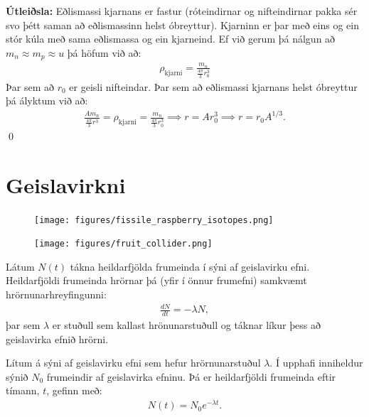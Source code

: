 \textbf{Útleiðsla:} Eðlismassi kjarnans er fastur (róteindirnar og nifteindirnar pakka sér svo þétt saman að eðlismassinn helst óbreyttur). Kjarninn er þar með eins og ein stór kúla með sama eðlismassa og ein kjarneind. Ef við gerum þá nálgun að $m_n \approx m_p \approx u$ þá höfum við að:
\begin{align*}
    \rho_{\text{kjarni}} = \frac{m_n}{\frac{4\pi}{3}r_0^3}
\end{align*}
Þar sem að $r_0$ er geisli nifteindar. Þar sem að eðlismassi kjarnans helst óbreyttur þá ályktum við að:
\begin{align*}
    \frac{Am_n}{\frac{4\pi}{3}r^3} = \rho_{\text{kjarni}} = \frac{m_n}{\frac{4\pi}{3}r_0^3} \implies r = Ar_0^3 \implies r = r_0 A^{1/3}.
\end{align*}
\qed

\section{Geislavirkni}

\begin{figure}[H]
    \centering
    \texttt{[image: figures/fissile\_raspberry\_isotopes.png]}
\end{figure}

\begin{figure}[H]
    \centering
    \texttt{[image: figures/fruit\_collider.png]}
\end{figure}

\begin{tcolorbox}
\begin{definition}
Látum $N(t)$ tákna heildarfjölda frumeinda í sýni af geislavirku efni. Heildarfjöldi frumeinda hrörnar þá (yfir í önnur frumefni) samkvæmt hrörnunarhreyfingunni: 
\begin{align*}
    \frac{dN}{dt} = -\lambda N,
\end{align*}
þar sem $\lambda$ er stuðull sem kallast hrönunarstuðull og táknar líkur þess að geislavirka efnið hrörni.
\end{definition}
\end{tcolorbox}

\begin{tcolorbox}
\begin{theorem}
Lítum á sýni af geislavirku efni sem hefur hrörnunarstuðul $\lambda$. Í upphafi inniheldur sýnið $N_0$ frumeindir af geislavirka efninu. Þá er heildarfjöldi frumeinda eftir tímann, $t$, gefinn með:
\begin{align*}
    N(t) = N_0 e^{-\lambda t}.
\end{align*}
\end{theorem}
\end{tcolorbox}

